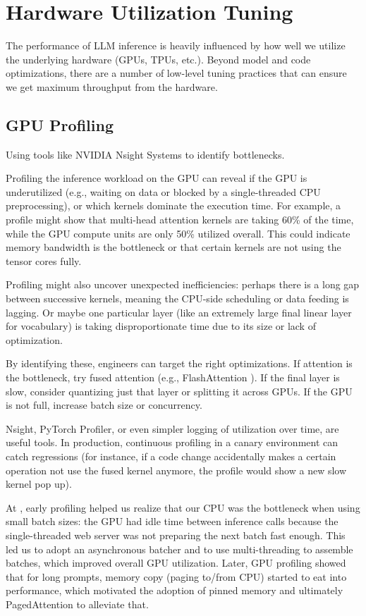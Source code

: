 \FloatBarrier
\section{Hardware Utilization Tuning}
\label{sec:perf-hw}
The performance of LLM inference is heavily influenced by how well we utilize the underlying hardware (GPUs, TPUs, etc.). Beyond model and code optimizations, there are a number of low-level tuning practices that can ensure we get maximum throughput from the hardware.

\subsection{GPU Profiling}
Using tools like NVIDIA Nsight Systems to identify bottlenecks.

Profiling the inference workload on the GPU can reveal if the GPU is underutilized (e.g., waiting on data or blocked by a single-threaded CPU preprocessing), or which kernels dominate the execution time. For example, a profile might show that multi-head attention kernels are taking 60\% of the time, while the GPU compute units are only 50\% utilized overall. This could indicate memory bandwidth is the bottleneck or that certain kernels are not using the tensor cores fully.

Profiling might also uncover unexpected inefficiencies: perhaps there is a long gap between successive kernels, meaning the CPU-side scheduling or data feeding is lagging. Or maybe one particular layer (like an extremely large final linear layer for vocabulary) is taking disproportionate time due to its size or lack of optimization.

By identifying these, engineers can target the right optimizations. If attention is the bottleneck, try fused attention (e.g., FlashAttention \cite{Dao2022FlashAttention}). If the final layer is slow, consider quantizing just that layer or splitting it across GPUs. If the GPU is not full, increase batch size or concurrency.

Nsight, PyTorch Profiler, or even simpler logging of utilization over time, are useful tools. In production, continuous profiling in a canary environment can catch regressions (for instance, if a code change accidentally makes a certain operation not use the fused kernel anymore, the profile would show a new slow kernel pop up).

At \ishtar{}, early profiling helped us realize that our CPU was the bottleneck when using small batch sizes: the GPU had idle time between inference calls because the single-threaded web server was not preparing the next batch fast enough. This led us to adopt an asynchronous batcher and to use multi-threading to assemble batches, which improved overall GPU utilization. Later, GPU profiling showed that for long prompts, memory copy (paging to/from CPU) started to eat into performance, which motivated the adoption of pinned memory and ultimately PagedAttention to alleviate that.

